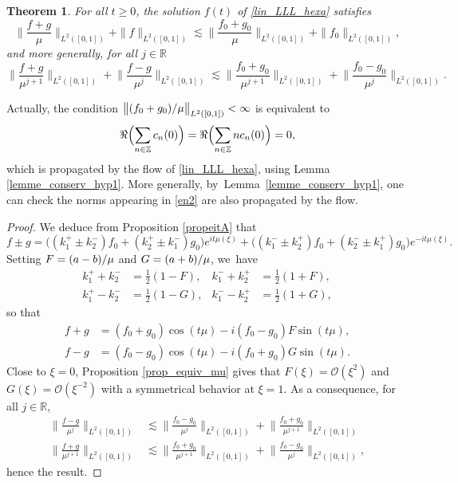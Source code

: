 \documentclass[10pt]{amsart}
\newtheorem{theorem}{Theorem}[section]
\theoremstyle{definition}
\let\dis\relax
\newcommand\R{\mathbb R}
\newcommand\Z{\mathbb Z}
\newcommand{\Bpa}[1]{\Bigl(#1\Bigr)}
\begin{document}
\begin{theorem}
\label{thmL2stable}
For all $t \geq 0$, the solution $f(t)$ of \eqref{lin_LLL_hexa} satisfies
\begin{equation*}
\Big\|\frac{{f}+{g}}{\mu} \Big\|_{L^2([0, 1])} + \|{f}\|_{L^2([0, 1])} \lesssim \Big\|\frac{{f}_0+{g}_0}{\mu} \Big\|_{L^2([0, 1])}+ \|{f}_0\|_{L^2([0, 1])},
\end{equation*}
and more generally, for all $j \in \R$
\begin{equation}\label{en2}
\Big\|\frac{{f}+{g}}{\mu^{j+1}} \Big\|_{L^2([0, 1])}+\Big\|\frac{{f}-{g}}{\mu^j} \Big\|_{L^2([0, 1])} \lesssim \Big\|\frac{{f}_0+{g}_0}{\mu^{j+1}} \Big\|_{L^2([0, 1])}+ \Big\|\frac{{f}_0-{g}_0}{\mu^j} \Big\|_{L^2([0, 1])}.
\end{equation}
\end{theorem}

Actually, the condition $\dis \big\|({f}_0+{g}_0)/{\mu} \big\|_{L^2([0, 1])} <\infty$ is equivalent to
\[
\Re\Bpa{\sum_{n\in\Z}c_n(0)} = \Re\Bpa{\sum_{n\in\Z}nc_n(0)}=0,
\]
which is propagated by the flow of \eqref{lin_LLL_hexa}, using Lemma \ref{lemme_conserv_hyp1}. More generally, by~Lem\-ma~\ref{lemme_conserv_hyp1}, one can check the norms appearing in \eqref{en2} are also propagated by the flow.

\begin{proof}
We deduce from Proposition \ref{propeitA} that
\[
{f}\pm{g} =\big ((k_1^{+}\pm k_{2}^{-}) {f}_0+ (k_2^{+}\pm k_{1}^{-}) {g}_0 \bigr)e^{it\mu(\xi)} + \big ((k_1^{-} \pm k_{2}^{+}) {f}_0+ (k_2^{-} \pm k_{1}^{+}) {g}_0 \bigr)e^{-it\mu(\xi)}. 
\]
Setting $\dis F=(a-b)/\mu$ and $\dis G=(a+b)/\mu$, we~have
\begin{align*}
k_1^{+}+k_{2}^{-}&=\frac12(1-F), & k_1^{-}+k_{2}^{+}&=\frac12(1+F), \\
k_1^{+}-k_{2}^{-}&=\frac12(1-G), & k_1^{-}-k_{2}^{+}&=\frac12(1+G),
\end{align*}
so that\vspace*{-3pt}
\begin{align*}
{f}+{g} &= ({f}_0+{g}_0)\cos(t \mu)-i ({f}_0-{g}_0) F \sin(t \mu), 
\\
{f}-{g} &= ({f}_0-{g}_0)\cos(t \mu)- i({f}_0+{g}_0) G \sin(t \mu).
\end{align*}
Close to $\xi=0$, Proposition \ref{prop_equiv_mu} gives that $F(\xi) =\mathcal{O}(\xi^2)$ and $G(\xi) =\mathcal{O}(\xi^{-2})$ with a symmetrical behavior at $\xi=1$. As a consequence, for all $j \in \mathbb{R}$,
\begin{align*}
\Big\|\frac{{f}-{g}}{\mu^j} \Big\|_{L^2([0, 1])} &\lesssim \Big\|\frac{{f}_0-{g}_0}{\mu^j} \Big\|_{L^2([0, 1])}+ \Big\|\frac{{f}_0+{g}_0}{\mu^{j+1}} \Big\|_{L^2([0, 1])} \\[4pt]
\Big\|\frac{{f}+{g}}{\mu^{j+1}} \Big\|_{L^2([0, 1])} &\lesssim \Big\|\frac{{f}_0+{g}_0}{\mu^{j+1}} \Big\|_{L^2([0, 1])}+ \Big\|\frac{{f}_0-{g}_0}{\mu^j} \Big\|_{L^2([0, 1])},
\end{align*}
hence the result.
\end{proof}
\end{document}
